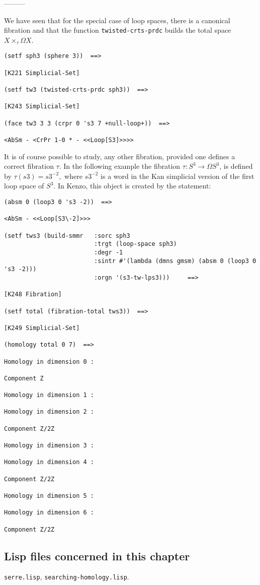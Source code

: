 \begin{center}
---------
\end{center}
We have seen that for the special case of loop spaces, there is a
canonical fibration and that the function {\tt twisted-crts-prdc}
builds the total space $X \times_\tau \Omega X$.
{\footnotesize\begin{verbatim}
(setf sph3 (sphere 3))  ==>

[K221 Simplicial-Set]

(setf tw3 (twisted-crts-prdc sph3))  ==>

[K243 Simplicial-Set]

(face tw3 3 3 (crpr 0 's3 7 +null-loop+))  ==>

<AbSm - <CrPr 1-0 * - <<Loop[S3]>>>>
\end{verbatim}}
It is of course possible to study, any other fibration, provided one
defines a correct fibration $\tau$. In the following example
the fibration $\tau: S^3 \longrightarrow \Omega S^3$, is defined
by
$\tau(s3)= s3^{-2},$ where $s3^{-2}$ is a word in the Kan simplicial version
of the first loop space of $S^3$. In Kenzo, this object is created by the
statement:
{\footnotesize\begin{verbatim}
(absm 0 (loop3 0 's3 -2))  ==>

<AbSm - <<Loop[S3\-2]>>>

(setf tws3 (build-smmr   :sorc sph3
                         :trgt (loop-space sph3)
                         :degr -1
                         :sintr #'(lambda (dmns gmsm) (absm 0 (loop3 0 's3 -2)))
                         :orgn '(s3-tw-lps3)))     ==>

[K248 Fibration]

(setf total (fibration-total tws3))  ==>

[K249 Simplicial-Set]

(homology total 0 7)  ==>

Homology in dimension 0 :

Component Z

Homology in dimension 1 :

Homology in dimension 2 :

Component Z/2Z

Homology in dimension 3 :

Homology in dimension 4 :

Component Z/2Z

Homology in dimension 5 :

Homology in dimension 6 :

Component Z/2Z
\end{verbatim}}
\newpage

\subsection* {Lisp files concerned in this chapter}

{\tt serre.lisp}, {\tt searching-homology.lisp}.
